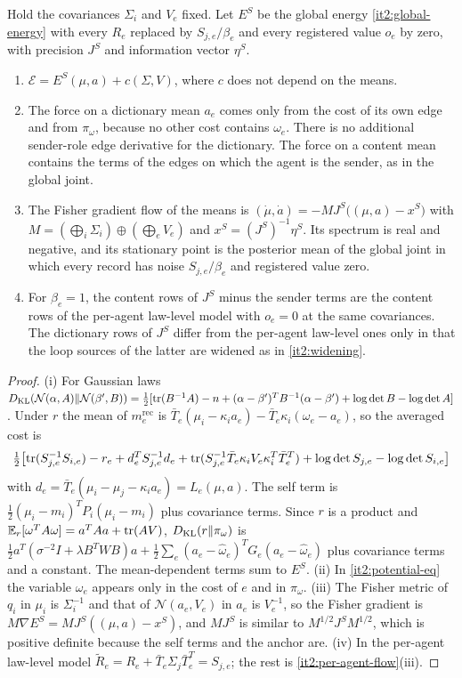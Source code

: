 \documentclass[11pt,letterpaper]{report}
\begin{document}
Hold the covariances $\Sigma_i$ and $V_e$ fixed. Let $E^S$ be the global energy \cref{it2:global-energy} with every $R_e$ replaced by $S_{j,e}/\beta_e$ and every registered value $o_e$ by zero, with precision $J^S$ and information vector $\eta^S$.
\begin{enumerate}
\item[(i)] $\mathcal E=E^S(\mu,a)+c(\Sigma,V)$, where $c$ does not depend on the means.
\item[(ii)] The force on a dictionary mean $a_e$ comes only from the cost of its own edge and from $\pi_\omega$, because no other cost contains $\omega_e$. There is no additional sender-role edge derivative for the dictionary. The force on a content mean contains the terms of the edges on which the agent is the sender, as in the global joint.
\item[(iii)] The Fisher gradient flow of the means is $(\dot\mu,\dot a)=-MJ^S\bigl((\mu,a)-x^S\bigr)$ with $M=(\bigoplus_i\Sigma_i)\oplus(\bigoplus_eV_e)$ and $x^S=(J^S)^{-1}\eta^S$. Its spectrum is real and negative, and its stationary point is the posterior mean of the global joint in which every record has noise $S_{j,e}/\beta_e$ and registered value zero.
\item[(iv)] For $\beta_e=1$, the content rows of $J^S$ minus the sender terms are the content rows of the per-agent law-level model with $o_e=0$ at the same covariances. The dictionary rows of $J^S$ differ from the per-agent law-level ones only in that the loop sources of the latter are widened as in \cref{it2:widening}.
\end{enumerate}
\begin{proof}
(i) For Gaussian laws $D_{\mathrm{KL}}(\mathcal N(\alpha,A)\Vert\mathcal N(\beta',B))=\frac12[\operatorname{tr}(B^{-1}A)-n+(\alpha-\beta')^TB^{-1}(\alpha-\beta')+\log\det B-\log\det A]$. Under $r$ the mean of $m_e^{\mathrm{rec}}$ is $\bar T_e(\mu_i-\kappa_ia_e)-\bar T_e\kappa_i(\omega_e-a_e)$, so the averaged cost is
\begin{equation}
\tfrac12\bigl[\operatorname{tr}(S_{j,e}^{-1}S_{i,e})-r_e+d_e^TS_{j,e}^{-1}d_e+\operatorname{tr}(S_{j,e}^{-1}\bar T_e\kappa_iV_e\kappa_i^T\bar T_e^T)+\log\det S_{j,e}-\log\det S_{i,e}\bigr]
\end{equation}
with $d_e=\bar T_e(\mu_i-\mu_j-\kappa_ia_e)=L_e(\mu,a)$. The self term is $\frac12(\mu_i-m_i)^TP_i(\mu_i-m_i)$ plus covariance terms. Since $r$ is a product and $\mathbb E_r[\omega^TA\omega]=a^TAa+\operatorname{tr}(AV)$, $D_{\mathrm{KL}}(r\Vert\pi_\omega)$ is $\frac12a^T(\sigma^{-2}I+\lambda B^TWB)a+\frac12\sum_e(a_e-\hat\omega_e)^TG_e(a_e-\hat\omega_e)$ plus covariance terms and a constant. The mean-dependent terms sum to $E^S$. (ii) In \cref{it2:potential-eq} the variable $\omega_e$ appears only in the cost of $e$ and in $\pi_\omega$. (iii) The Fisher metric of $q_i$ in $\mu_i$ is $\Sigma_i^{-1}$ and that of $\mathcal N(a_e,V_e)$ in $a_e$ is $V_e^{-1}$, so the Fisher gradient is $M\nabla E^S=MJ^S((\mu,a)-x^S)$, and $MJ^S$ is similar to $M^{1/2}J^SM^{1/2}$, which is positive definite because the self terms and the anchor are. (iv) In the per-agent law-level model $\tilde R_e=R_e+\bar T_e\Sigma_j\bar T_e^T=S_{j,e}$; the rest is \cref{it2:per-agent-flow}(iii).
\end{proof}
\end{document}
